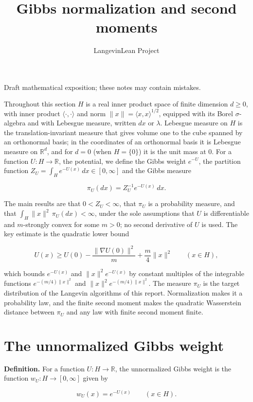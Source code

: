 \documentclass[11pt,a4paper]{article}
\title{\texorpdfstring{Gibbs normalization and second moments}{Gibbs normalization and second moments}}
\author{LangevinLean Project}
\date{}
\begin{document}
\maketitle
Draft mathematical exposition; these notes may contain mistakes.


Throughout this section \(H\) is a real inner product space of finite dimension \(d\ge0\), with inner product \(\langle\cdot,\cdot\rangle\) and norm \(\|x\|=\langle x,x\rangle^{1/2}\), equipped with its Borel \(\sigma\)-algebra and with Lebesgue measure, written \(dx\) or \(\lambda\). Lebesgue measure on \(H\) is the translation-invariant measure that gives volume one to the cube spanned by an orthonormal basis; in the coordinates of an orthonormal basis it is Lebesgue measure on \(\mathbb R^d\), and for \(d=0\) (when \(H=\{0\}\)) it is the unit mass at \(0\). For a function \(U:H\to\mathbb R\), the potential, we define the Gibbs weight \(e^{-U}\), the partition function \(Z_U=\int_He^{-U(x)}\,dx\in[0,\infty]\) and the Gibbs measure


\[\pi_U(dx)=Z_U^{-1}e^{-U(x)}\,dx.\]


The main results are that \(0<Z_U<\infty\), that \(\pi_U\) is a probability measure, and that \(\int_H\|x\|^2\,\pi_U(dx)<\infty\), under the sole assumptions that \(U\) is differentiable and \(m\)-strongly convex for some \(m>0\); no second derivative of \(U\) is used. The key estimate is the quadratic lower bound


\[U(x)\ge U(0)-\frac{\|\nabla U(0)\|^2}{m}+\frac m4\|x\|^2\qquad(x\in H),\]


which bounds \(e^{-U(x)}\) and \(\|x\|^2e^{-U(x)}\) by constant multiples of the integrable functions \(e^{-(m/4)\|x\|^2}\) and \(\|x\|^2e^{-(m/4)\|x\|^2}\). The measure \(\pi_U\) is the target distribution of the Langevin algorithms of this report. Normalization makes it a probability law, and the finite second moment makes the quadratic Wasserstein distance between \(\pi_U\) and any law with finite second moment finite.


\section{\texorpdfstring{The unnormalized Gibbs weight}{The unnormalized Gibbs weight}}


\textbf{Definition.} For a function \(U:H\to\mathbb R\), the unnormalized Gibbs weight is the function \(w_U:H\to[0,\infty]\) given by


\[w_U(x)=e^{-U(x)}\qquad(x\in H).\]
\end{document}
